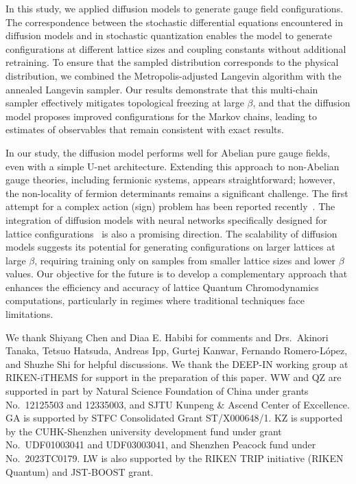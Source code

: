\documentclass[a4paper,11pt]{article}
\begin{document}
In this study, we applied diffusion models to generate gauge field configurations. The correspondence between the stochastic differential equations encountered in diffusion models and in stochastic quantization enables the model to generate configurations at different lattice sizes and coupling constants without additional retraining. To ensure that the sampled distribution corresponds to the physical distribution, we combined the Metropolis-adjusted Langevin algorithm with the annealed Langevin sampler. Our results demonstrate that this multi-chain sampler effectively mitigates topological freezing at large $\beta$, and that the diffusion model proposes improved configurations for the Markov chains, leading to estimates of observables that remain consistent with exact results.

In our study, the diffusion model performs well for Abelian pure gauge fields, even with a simple U-net architecture. Extending this approach to non-Abelian gauge theories, including fermionic systems, appears straightforward; however, the non-locality of fermion determinants remains a significant challenge. The first attempt for a complex action (sign) problem has been reported recently~\cite{Habibi:2024fbn}. The integration of diffusion models with neural networks specifically designed for lattice configurations~\cite{Favoni:2020reg,Nagai:2021bhh,Nagai:2025rok,Aarts:2025gyp} is also a promising direction. The scalability of diffusion models suggests its potential for generating configurations on larger lattices at large $\beta$, requiring training only on samples from smaller lattice sizes and lower $\beta$ values. Our objective for the future is to develop a complementary approach that enhances the efficiency and accuracy of lattice Quantum Chromodynamics computations, particularly in regimes where traditional techniques face limitations.

\acknowledgments

We thank Shiyang Chen and Diaa E. Habibi for comments and Drs.\ Akinori Tanaka, Tetsuo Hatsuda, Andreas Ipp, Gurtej Kanwar, Fernando Romero-L\'opez, and Shuzhe Shi for helpful discussions.
We thank the DEEP-IN working group at RIKEN-iTHEMS for support in the preparation of this paper.
WW and QZ are supported in part by Natural Science Foundation of China under grants No.\ 12125503 and 12335003, and SJTU Kunpeng \& Ascend Center of Excellence. GA is supported by STFC Consolidated Grant 
ST/X000648/1.
KZ is supported by the CUHK-Shenzhen university development fund under grant No.\ UDF01003041 and UDF03003041, and Shenzhen Peacock fund under No.\ 2023TC0179. LW is also supported by the RIKEN TRIP initiative (RIKEN Quantum) and JST-BOOST grant. 
\end{document}
